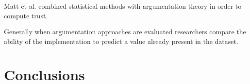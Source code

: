 Matt et al.\cite{matt2010combining} combined statistical methods with argumentation theory in order to compute trust.

Generally when argumentation approaches are evaluated researchers compare the ability of the implementation to predict a value already present in the dataset. 








\section{Conclusions}


